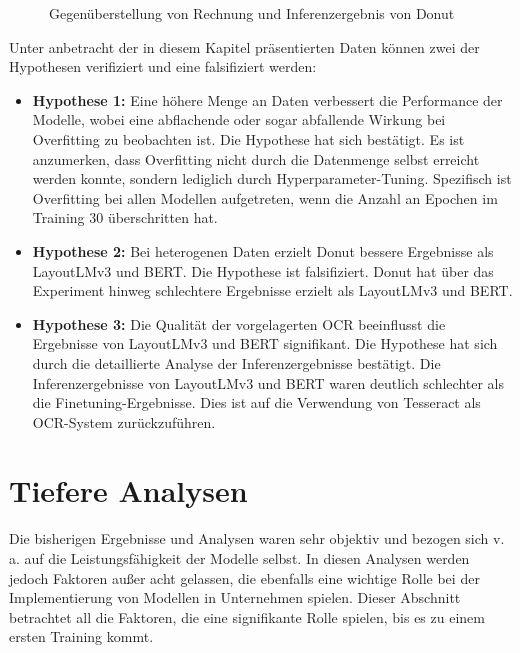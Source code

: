 \begin{figure}[]
\begin{minipage}{0.45\textwidth}
    \end{minipage}
    \caption{Gegenüberstellung von Rechnung und Inferenzergebnis von Donut}
    \label{fig:donut_inference}
\end{figure}

Unter anbetracht der in diesem Kapitel präsentierten Daten können zwei der Hypothesen verifiziert und eine falsifiziert werden:
\begin{itemize}
    \item \textbf{Hypothese 1:} Eine höhere Menge an Daten verbessert die Performance der Modelle, wobei
    eine abflachende oder sogar abfallende Wirkung bei Overfitting zu beobachten ist. Die Hypothese hat sich bestätigt. Es ist anzumerken, dass Overfitting nicht durch die Datenmenge selbst erreicht werden konnte, sondern lediglich durch Hyperparameter-Tuning. Spezifisch ist Overfitting bei allen Modellen aufgetreten, wenn die Anzahl an Epochen im Training 30 überschritten hat.
    \item \textbf{Hypothese 2:} Bei heterogenen Daten erzielt Donut bessere Ergebnisse als LayoutLMv3 und BERT. Die Hypothese ist falsifiziert. Donut hat über das Experiment hinweg schlechtere Ergebnisse erzielt als LayoutLMv3 und BERT.
    \item \textbf{Hypothese 3:} Die Qualität der vorgelagerten OCR beeinflusst die Ergebnisse von LayoutLMv3 und BERT signifikant. Die Hypothese hat sich durch die detaillierte Analyse der Inferenzergebnisse bestätigt. Die Inferenzergebnisse von LayoutLMv3 und BERT waren deutlich schlechter als die Finetuning-Ergebnisse. Dies ist auf die Verwendung von Tesseract als OCR-System zurückzuführen.
\end{itemize}

\section{Tiefere Analysen}
Die bisherigen Ergebnisse und Analysen waren sehr objektiv und bezogen sich v. a. auf die Leistungsfähigkeit der Modelle selbst. In diesen Analysen werden jedoch Faktoren außer acht gelassen, die ebenfalls eine wichtige Rolle bei der Implementierung von Modellen in Unternehmen spielen. Dieser Abschnitt betrachtet all die Faktoren, die eine signifikante Rolle spielen, bis es zu einem ersten Training kommt.

